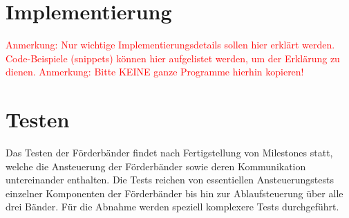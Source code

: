 \documentclass[a4paper, 11pt]{article}
\begin{document}
\newpage

\label{sec:hsm3}

\newpage
\section{Implementierung}
\textcolor{red}{Anmerkung: Nur wichtige Implementierungsdetails sollen hier erklärt werden. Code-Beispiele (snippets) können hier aufgelistet werden, um der Erklärung zu dienen. 
Anmerkung: Bitte KEINE ganze Programme hierhin kopieren!
}

\section{Testen}
Das Testen der Förderbänder findet nach Fertigstellung von Milestones statt, welche die Ansteuerung der Förderbänder sowie deren Kommunikation untereinander enthalten. Die Tests reichen von essentiellen Ansteuerungstests einzelner Komponenten der Förderbänder bis hin zur Ablaufsteuerung über alle drei Bänder. Für die Abnahme werden speziell komplexere Tests durchgeführt.
\end{document}
